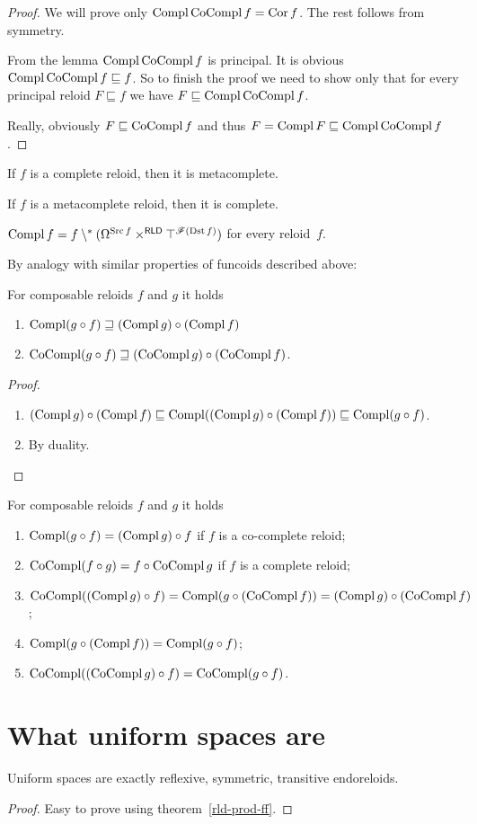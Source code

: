 \begin{proof}
We will prove only $\operatorname{Compl}\operatorname{CoCompl} f=\operatorname{Cor} f$. The rest follows from
symmetry.

From the lemma $\operatorname{Compl}\operatorname{CoCompl} f$ is principal. It is obvious $\operatorname{Compl}\operatorname{CoCompl} f\sqsubseteq f$.
So to finish the proof we need to show only that for every principal
reloid $F\sqsubseteq f$ we have $F\sqsubseteq\operatorname{Compl}\operatorname{CoCompl} f$.

Really, obviously $F\sqsubseteq\operatorname{CoCompl} f$ and thus $F=\operatorname{Compl} F\sqsubseteq\operatorname{Compl}\operatorname{CoCompl} f$.\end{proof}
\begin{conjecture}\label{rld-compl-mcompl}
If $f$ is a complete reloid, then it is metacomplete.
\end{conjecture}

\begin{conjecture}
If $f$ is a metacomplete reloid, then it is complete.
\end{conjecture}

\begin{conjecture}
$\operatorname{Compl} f=f\setminus^{\ast}(\Omega^{\operatorname{Src} f}\times^{\mathsf{RLD}}\top^{\mathscr{F}(\operatorname{Dst} f)})$
for every reloid~$f$.
\end{conjecture}
By analogy with similar properties of funcoids described above:
\begin{prop}
For composable reloids $f$ and $g$ it holds
\begin{enumerate}
\item $\operatorname{Compl}(g\circ f)\sqsupseteq(\operatorname{Compl} g)\circ(\operatorname{Compl} f)$
\item $\operatorname{CoCompl}(g\circ f)\sqsupseteq(\operatorname{CoCompl} g)\circ(\operatorname{CoCompl} f)$.
\end{enumerate}
\end{prop}
\begin{proof}
~
\begin{enumerate}
\item $(\operatorname{Compl} g)\circ(\operatorname{Compl} f)\sqsubseteq\operatorname{Compl}((\operatorname{Compl} g)\circ(\operatorname{Compl} f))\sqsubseteq\operatorname{Compl}(g\circ f)$.
\item By duality.
\end{enumerate}
\end{proof}
\begin{conjecture}
For composable reloids $f$ and $g$ it holds
\begin{enumerate}
\item $\operatorname{Compl}(g\circ f)=(\operatorname{Compl} g)\circ f$ if $f$ is a co-complete reloid;
\item $\operatorname{CoCompl}(f\circ g)=f\circ\operatorname{CoCompl} g$ if $f$ is a complete reloid;
\item $\operatorname{CoCompl}((\operatorname{Compl} g)\circ f)=\operatorname{Compl}(g\circ(\operatorname{CoCompl} f))=(\operatorname{Compl} g)\circ(\operatorname{CoCompl} f)$;
\item $\operatorname{Compl}(g\circ(\operatorname{Compl} f))=\operatorname{Compl}(g\circ f)$;
\item $\operatorname{CoCompl}((\operatorname{CoCompl} g)\circ f)=\operatorname{CoCompl}(g\circ f)$.
\end{enumerate}
\end{conjecture}

\section{What uniform spaces are}
\begin{prop}
Uniform spaces are exactly
reflexive, symmetric, transitive endoreloids.\end{prop}
\begin{proof}
Easy to prove using theorem~\ref{rld-prod-ff}.\end{proof}

